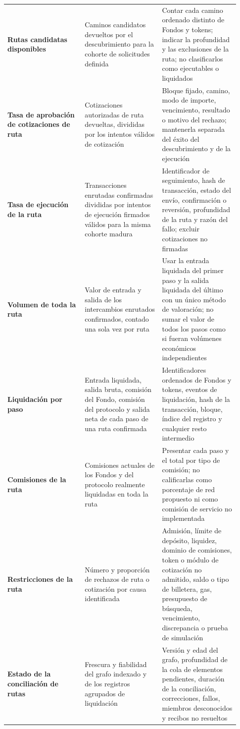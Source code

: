 \documentclass[11pt]{article}
\begin{document}
\begin{longtable}{P{0.31\linewidth} P{0.31\linewidth} P{0.31\linewidth}}
\textbf{Rutas candidatas disponibles} & Caminos candidatos devueltos por el descubrimiento para la cohorte de solicitudes definida & Contar cada camino ordenado distinto de Fondos y tokens; indicar la profundidad y las exclusiones de la ruta; no clasificarlos como ejecutables o liquidados \\
\textbf{Tasa de aprobación de cotizaciones de ruta} & Cotizaciones autorizadas de ruta devueltas, divididas por los intentos válidos de cotización & Bloque fijado, camino, modo de importe, vencimiento, resultado o motivo del rechazo; mantenerla separada del éxito del descubrimiento y de la ejecución \\
\textbf{Tasa de ejecución de la ruta} & Transacciones enrutadas confirmadas divididas por intentos de ejecución firmados válidos para la misma cohorte madura & Identificador de seguimiento, hash de transacción, estado del envío, confirmación o reversión, profundidad de la ruta y razón del fallo; excluir cotizaciones no firmadas \\
\textbf{Volumen de toda la ruta} & Valor de entrada y salida de los intercambios enrutados confirmados, contado una sola vez por ruta & Usar la entrada liquidada del primer paso y la salida liquidada del último con un único método de valoración; no sumar el valor de todos los pasos como si fueran volúmenes económicos independientes \\
\textbf{Liquidación por paso} & Entrada liquidada, salida bruta, comisión del Fondo, comisión del protocolo y salida neta de cada paso de una ruta confirmada & Identificadores ordenados de Fondos y tokens, eventos de liquidación, hash de la transacción, bloque, índice del registro y cualquier resto intermedio \\
\textbf{Comisiones de la ruta} & Comisiones actuales de los Fondos y del protocolo realmente liquidadas en toda la ruta & Presentar cada paso y el total por tipo de comisión; no calificarlas como porcentaje de red propuesto ni como comisión de servicio no implementada \\
\textbf{Restricciones de la ruta} & Número y proporción de rechazos de ruta o cotización por causa identificada & Admisión, límite de depósito, liquidez, dominio de comisiones, token o módulo de cotización no admitido, saldo o tipo de billetera, gas, presupuesto de búsqueda, vencimiento, discrepancia o prueba de simulación \\
\textbf{Estado de la conciliación de rutas} & Frescura y fiabilidad del grafo indexado y de los registros agrupados de liquidación & Versión y edad del grafo, profundidad de la cola de elementos pendientes, duración de la conciliación, correcciones, fallos, miembros desconocidos y recibos no resueltos \\

\end{longtable}
\end{document}
